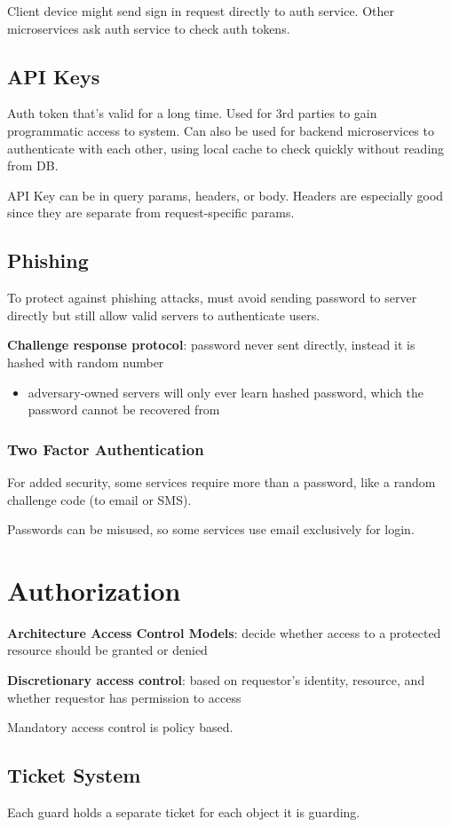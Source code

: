 \documentclass[11pt]{article}
\begin{document}
Client device might send sign in request directly to auth service.
Other microservices ask auth service to check auth tokens.
\subsection{API Keys}
\label{sec:orgc0dba23}
Auth token that's valid for a long time.
Used for 3rd parties to gain programmatic access to system.
Can also be used for backend microservices to authenticate with each other,
using local cache to check quickly without reading from DB.

API Key can be in query params, headers, or body.
Headers are especially good since they are separate from request-specific
params.
\subsection{Phishing}
\label{sec:org757622b}
To protect against phishing attacks, must avoid sending password to server
directly but still allow valid servers to authenticate users.

\textbf{Challenge response protocol}: password never sent directly, instead it is
hashed with random number
\begin{itemize}
\item adversary-owned servers will only ever learn hashed password, which the
password cannot be recovered from
\end{itemize}
\subsubsection{Two Factor Authentication}
\label{sec:org12fe8fc}
For added security, some services require more than a password, like a
random challenge code (to email or SMS).

Passwords can be misused, so some services use email exclusively for
login.
\section{Authorization}
\label{sec:orgde00cf1}
\textbf{Architecture Access Control Models}: decide whether access to a protected resource should be
granted or denied

\textbf{Discretionary access control}: based on requestor's identity, resource, and whether
requestor has permission to access

Mandatory access control is policy based.
\subsection{Ticket System}
\label{sec:orgf83a122}
Each guard holds a separate ticket for each object it is guarding.
\end{document}
